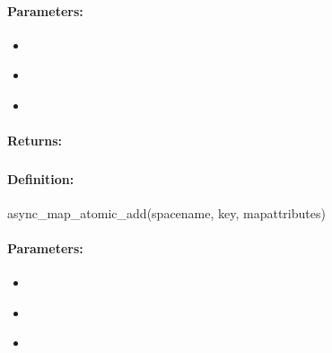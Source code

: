 \paragraph{Parameters:}
\begin{itemize}[noitemsep]
\item {}\\

\item {}\\

\item {}\\

\end{itemize}

\paragraph{Returns:}


\pagebreak
\subsubsection{}
\label{api:ruby:async_map_atomic_add}


\paragraph{Definition:}
\begin{rubycode}
async_map_atomic_add(spacename, key, mapattributes)
\end{rubycode}

\paragraph{Parameters:}
\begin{itemize}[noitemsep]
\item {}\\

\item {}\\

\item {}\\

\end{itemize}

